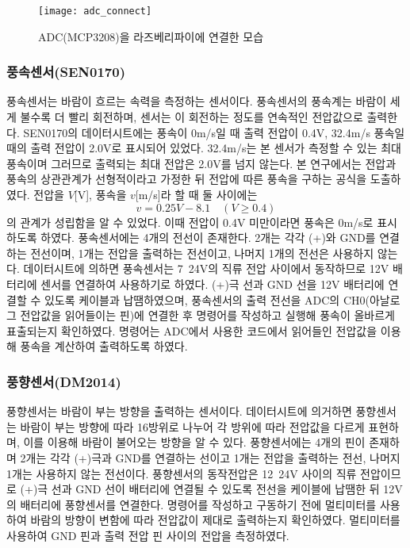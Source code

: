 \begin{figure}[htbp]
	\centering
	\texttt{[image: adc\_connect]}
	\caption{ADC(MCP3208)을 라즈베리파이에 연결한 모습}
	\label{ADCCON}
\end{figure}

\subsubsection{풍속센서(SEN0170)}
풍속센서는 바람이 흐르는 속력을 측정하는 센서이다. 풍속센서의 풍속계는 바람이 세게 불수록 더 빨리 회전하며, 센서는 이 회전하는 정도를 연속적인 전압값으로 출력한다. SEN0170의 데이터시트에는 풍속이 0m/s일 때 출력 전압이 0.4V, 32.4m/s 풍속일 때의 출력 전압이 2.0V로 표시되어 있었다. 32.4m/s는 본 센서가 측정할 수 있는 최대 풍속이며 그러므로 출력되는 최대 전압은 2.0V를 넘지 않는다. 본 연구에서는 전압과 풍속의 상관관계가 선형적이라고 가정한 뒤 전압에 따른 풍속을 구하는 공식을 도출하였다. 전압을 $V$[V], 풍속을 $v$[m/s]라 할 때 둘 사이에는
\[ v=0.25V-8.1\quad (V\geq 0.4)\]
의 관계가 성립함을 알 수 있었다. 이때 전압이 0.4V 미만이라면 풍속은 0m/s로 표시하도록 하였다.
풍속센서에는 4개의 전선이 존재한다. 2개는 각각 (+)와 GND를 연결하는 전선이며, 1개는 전압을 출력하는 전선이고, 나머지 1개의 전선은 사용하지 않는다. 데이터시트에 의하면 풍속센서는 7~24V의 직류 전압 사이에서 동작하므로 12V 배터리에 센서를 연결하여 사용하기로 하였다. (+)극 선과 GND 선을 12V 배터리에 연결할 수 있도록 케이블과 납땜하였으며, 풍속센서의 출력 전선을 ADC의 CH0(아날로그 전압값을 읽어들이는 핀)에 연결한 후 명령어를 작성하고 실행해 풍속이 올바르게 표출되는지 확인하였다. 명령어는 ADC에서 사용한 코드에서 읽어들인 전압값을 이용해 풍속을 계산하여 출력하도록 하였다.

\subsubsection{풍향센서(DM2014)}
풍향센서는 바람이 부는 방향을 출력하는 센서이다. 데이터시트에 의거하면 풍향센서는 바람이 부는 방향에 따라 16방위로 나누어 각 방위에 따라 전압값을 다르게 표현하며, 이를 이용해 바람이 불어오는 방향을 알 수 있다. 풍향센서에는 4개의 핀이 존재하며 2개는 각각 (+)극과 GND를 연결하는 선이고 1개는 전압을 출력하는 전선, 나머지 1개는 사용하지 않는 전선이다. 풍향센서의 동작전압은 12~24V 사이의 직류 전압이므로 (+)극 선과 GND 선이 배터리에 연결될 수 있도록 전선을 케이블에 납땜한 뒤 12V의 배터리에 풍향센서를 연결한다. 명령어를 작성하고 구동하기 전에 멀티미터를 사용하여 바람의 방향이 변함에 따라 전압값이 제대로 출력하는지 확인하였다. 멀티미터를 사용하여 GND 핀과 출력 전압 핀 사이의 전압을 측정하였다.

